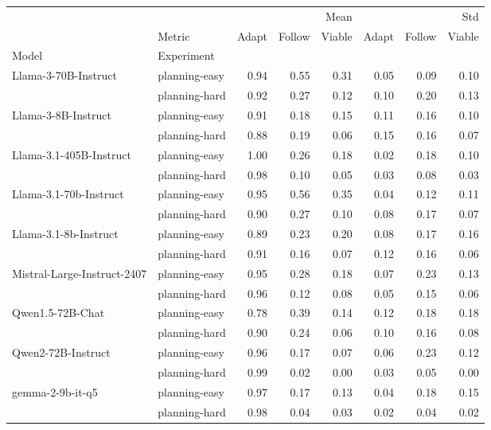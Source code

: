\begin{tabular}{llrrrrrr}
\hline
 &  & \multicolumn{3}{r}{Mean} & \multicolumn{3}{r}{Std} \\
 & Metric & Adapt & Follow & Viable & Adapt & Follow & Viable \\
Model & Experiment &  &  &  &  &  &  \\
\multirow[c]{2}{*}{Llama-3-70B-Instruct} & planning-easy & 0.94 & 0.55 & 0.31 & 0.05 & 0.09 & 0.10 \\
 & planning-hard & 0.92 & 0.27 & 0.12 & 0.10 & 0.20 & 0.13 \\
\cline{1-8}
\multirow[c]{2}{*}{Llama-3-8B-Instruct} & planning-easy & 0.91 & 0.18 & 0.15 & 0.11 & 0.16 & 0.10 \\
 & planning-hard & 0.88 & 0.19 & 0.06 & 0.15 & 0.16 & 0.07 \\
\cline{1-8}
\multirow[c]{2}{*}{Llama-3.1-405B-Instruct} & planning-easy & 1.00 & 0.26 & 0.18 & 0.02 & 0.18 & 0.10 \\
 & planning-hard & 0.98 & 0.10 & 0.05 & 0.03 & 0.08 & 0.03 \\
\cline{1-8}
\multirow[c]{2}{*}{Llama-3.1-70b-Instruct} & planning-easy & 0.95 & 0.56 & 0.35 & 0.04 & 0.12 & 0.11 \\
 & planning-hard & 0.90 & 0.27 & 0.10 & 0.08 & 0.17 & 0.07 \\
\cline{1-8}
\multirow[c]{2}{*}{Llama-3.1-8b-Instruct} & planning-easy & 0.89 & 0.23 & 0.20 & 0.08 & 0.17 & 0.16 \\
 & planning-hard & 0.91 & 0.16 & 0.07 & 0.12 & 0.16 & 0.06 \\
\cline{1-8}
\multirow[c]{2}{*}{Mistral-Large-Instruct-2407} & planning-easy & 0.95 & 0.28 & 0.18 & 0.07 & 0.23 & 0.13 \\
 & planning-hard & 0.96 & 0.12 & 0.08 & 0.05 & 0.15 & 0.06 \\
\cline{1-8}
\multirow[c]{2}{*}{Qwen1.5-72B-Chat} & planning-easy & 0.78 & 0.39 & 0.14 & 0.12 & 0.18 & 0.18 \\
 & planning-hard & 0.90 & 0.24 & 0.06 & 0.10 & 0.16 & 0.08 \\
\cline{1-8}
\multirow[c]{2}{*}{Qwen2-72B-Instruct} & planning-easy & 0.96 & 0.17 & 0.07 & 0.06 & 0.23 & 0.12 \\
 & planning-hard & 0.99 & 0.02 & 0.00 & 0.03 & 0.05 & 0.00 \\
\cline{1-8}
\multirow[c]{2}{*}{gemma-2-9b-it-q5} & planning-easy & 0.97 & 0.17 & 0.13 & 0.04 & 0.18 & 0.15 \\
 & planning-hard & 0.98 & 0.04 & 0.03 & 0.02 & 0.04 & 0.02 \\

\end{tabular}
